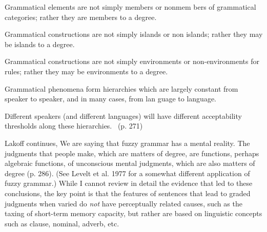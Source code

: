 \begin{listWWNumliiileveli}
\item 
\setcounter{listWWNumliiilevelii}{2}
\begin{listWWNumliiilevelii}
\item 
\setcounter{listWWNumliiileveliii}{0}
\begin{listWWNumliiileveliii}
\item 
\setcounter{listWWNumliiileveliv}{0}
\begin{listWWNumliiileveliv}
\item 
\begin{styleStandard}
Grammatical elements are not simply members or nonmem\- bers of grammatical categories; rather they are members to a degree.
\end{styleStandard}


\item 
\begin{styleStandard}
Grammatical constructions are not simply islands or non\- islands; rather they may be islands to a degree.
\end{styleStandard}


\item 
\begin{styleStandard}
Grammatical constructions are not simply environments or non-environments for rules; rather they may be environments to a degree.
\end{styleStandard}


\item 
\begin{styleStandard}
Grammatical phenomena form hierarchies which are largely constant from speaker to speaker, and in many cases, from lan\- guage to language.
\end{styleStandard}


\item 
\begin{styleStandard}
Different speakers (and different languages) will have different acceptability thresholds along these hierarchies. \ (p. 271)
\end{styleStandard}


\end{listWWNumliiileveliv}
\end{listWWNumliiileveliii}
\end{listWWNumliiilevelii}
\end{listWWNumliiileveli}
\begin{styleStandard}
Lakoff continues, {\textquotedbl}We are saying that fuzzy grammar has a mental reality. The judgments that people make, which are matters of degree, are functions, perhaps algebraic functions, of unconscious mental judgments, which are also matters of degree{\textquotedbl} (p. 286). (See Levelt et al. 1977 for a somewhat different application of fuzzy grammar.) While I cannot review in detail the evidence that led to these conclusions, the key point is that the features of sentences that lead to graded judgments when varied do \textit{not}\textit{ }have perceptually related causes, such as the taxing of short-term memory capacity, but rather are based on linguistic concepts such as clause, nominal, adverb, etc.
\end{styleStandard}



